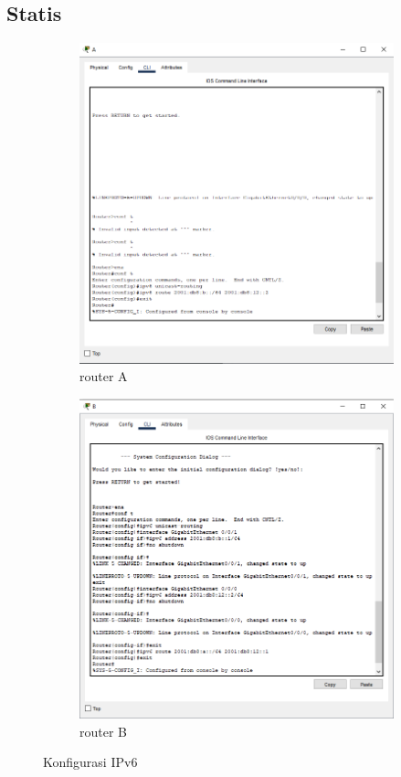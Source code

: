 \subsection{Statis}
\begin{figure}[H]
    \centering
    \begin{subfigure}[b]{0.3\linewidth}
      \centering
      \includegraphics[width=\linewidth]{image/statiss.png}
      \caption{router A}
    \end{subfigure}
    \hspace{1cm}
    \begin{subfigure}[b]{0.3\linewidth}
      \centering
      \includegraphics[width=\linewidth]{image/statisd.png}
      \caption{router B}
    \end{subfigure}
    \caption{Konfigurasi IPv6}
\end{figure}
